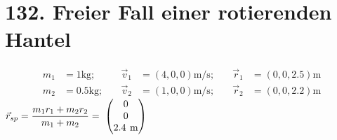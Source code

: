 \documentclass{alex_hü}
\begin{document}
\renewcommand{\labelenumi}{\alph{enumi})}


\section*{132. Freier Fall einer rotierenden Hantel}
\begin{align*}
	m_1 &= 1 \si{\kg};\quad &\vec{v}_1 &= \left(4, 0, 0\right) \si{\m\per\s};\quad &\vec{r}_1 &= \left(0, 0, 2.5\right)\si{\m}  \\
	m_2 &= 0.5 \si{\kg};\quad  &\vec{v}_2 &= \left(1, 0, 0\right)\si{\m\per\s};\quad &\vec{r}_2 &= \left(0, 0, 2.2\right)\si{\m} 
\end{align*}
	\centering \( \vec{r}_{sp} = \dfrac{m_1r_1 + m_2r_2}{m_1 + m_2} = \vector{0\\ 0\\ 2.4\si{\m}}\) \\
	
\end{document}
